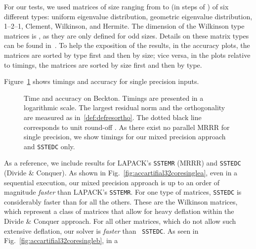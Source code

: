 \documentclass[final]{siamltex}
\begin{document}
For our tests, we used matrices of size ranging from  to
 (in steps of ) of six different types: uniform eigenvalue distribution,
geometric eigenvalue distribution, 1--2--1, Clement, Wilkinson, and Hermite. The
dimension of the Wilkinson type matrices is , as they are
only defined for odd sizes. Details on these matrix types can be found
in~\cite{Marques:2008}. 
To help the exposition of the results, in the accuracy plots, the matrices
are sorted by type first and then by size; vice versa, in the plots relative
to timings, the matrices are sorted by size first and then by type.  

Figure~\ref{fig:accartifial32coresingle} shows
timings and accuracy for single precision inputs. 
\begin{figure}[bth]
   \centering   
    

    

   \caption{
     Time and accuracy on {\sc Beckton}. Timings are presented in a
     logarithmic scale. The largest residual norm and the orthogonality are
     measured as in~\eqref{def:defresortho}. The dotted black line
     corresponds to unit round-off . As there exist no parallel MRRR for
     single precision, we show timings for our mixed precision approach and
     {\tt SSTEDC} only. 
   }
   \label{fig:accartifial32coresingle}
\end{figure}
As a reference, we include
results for LAPACK's {\tt SSTEMR} (MRRR) and {\tt SSTEDC} (Divide \& Conquer). 
As shown in Fig.~\ref{fig:accartifial32coresinglea}, even in a sequential execution, our mixed precision approach is up to an
order of magnitude {\it faster} than LAPACK's {\tt SSTEMR}. For one type of
matrices, {\tt SSTEDC} 
is considerably faster than for all 
the others. These are the Wilkinson matrices, which represent a class of
matrices that allow for heavy deflation within the Divide \& Conquer
approach. For all other matrices, which do 
not allow such extensive deflation, our solver is {\it faster} than {\tt
  SSTEDC}. As seen in Fig.~\ref{fig:accartifial32coresingleb}, in a
\end{document}
